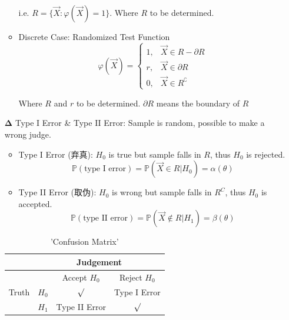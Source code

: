 \begin{itemize}[topsep = -3 pt]
\begin{itemize}
        i.e. $R=\{\vec{X}:\varphi(\vec{X})=1\}$. Where $R$ to be determined.

        \item Discrete Case: Randomized Test Function
        \begin{equation}
        \varphi(\vec{X})=\begin{cases}
            1,&\vec{X}\in R-\partial R\\
            r,&\vec{X}\in \partial R\\
            0,&\vec{X}\in R^\complement
        \end{cases}    
        \end{equation}

        Where $R$ and $r$  to be determined. $\partial R$ means the boundary of $ R $
    \end{itemize}
        \item[$ \bm{\Delta } $] Type I Error \& Type II Error: Sample is random, possible to make a wrong judge.
            
        \begin{itemize}[topsep = -4 pt]
            \item Type I Error (弃真): $H_0$ is true but sample falls in $R$, thus $H_0$ is rejected.
            \begin{equation}\mathbb{P}(\text{type I error})=\mathbb{P}(\vec{X}\in R|H_0)=\alpha(\theta)\end{equation}
            \item Type II Error (取伪): $H_0$ is wrong but sample falls in $R^C$, thus $H_0$ is accepted.
            \begin{equation}\mathbb{P}(\text{type II error})=\mathbb{P}(\vec{X}\notin R|H_1)=\beta(\theta)\end{equation}
        \end{itemize}

    \begin{table}[htbp]
        \centering
        \begin{tabular}{c|ccc}
            \hline
            &\multicolumn{3}{c}{Judgement}\\
            \hline
            \multirow{3}{*}{Truth}&&Accept $H_0$&Reject $H_0$\\ 
            &$H_0$&$\surd$&Type I Error\\ 
            &$H_1$&Type II Error&$\surd$\\ 
            \hline
        \end{tabular}
        \caption{'Confusion Matrix'}
    \end{table}


\end{itemize}
